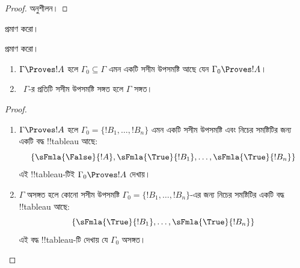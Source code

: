 \documentclass[../../../include/open-logic-section]{subfiles}
\begin{document}
\begin{proof}
অনুশীলন।
\end{proof}

\begin{prob}
 প্রমাণ করো।
\end{prob}
\tagendprob

\begin{prob}
 প্রমাণ করো।
\end{prob}
\tagendprob

\begin{prop}[সংহতি]
  \begin{enumerate}
  \item $\Gamma \Proves !A$ হলে $\Gamma_0\subseteq\Gamma$ এমন একটি
    সসীম উপসমষ্টি আছে যেন $\Gamma_0 \Proves !A$।
  \item ~$\Gamma$-র প্রতিটি সসীম উপসমষ্টি সঙ্গত হলে $\Gamma$ সঙ্গত।
  \end{enumerate}
\end{prop}

\begin{proof}
  \begin{enumerate}
    \item $\Gamma \Proves !A$ হলে
      $\Gamma_0=\{!B_1,\dots,!B_n\}$ এমন একটি সসীম উপসমষ্টি এবং
      নিচের সমষ্টিটির জন্য একটি বদ্ধ !!{tableau} আছে:
      \[
      \{\sFmla{\False}{!A}, \sFmla{\True}{!B_1}, \dots, \sFmla{\True}{!B_n}\}
      \]
      এই !!{tableau}-টিই $\Gamma_0 \Proves !A$ দেখায়।
    \item $\Gamma$ অসঙ্গত হলে কোনো সসীম উপসমষ্টি
      $\Gamma_0=\{!B_1,\dots,!B_n\}$-এর জন্য নিচের সমষ্টিটির একটি
      বদ্ধ !!{tableau} আছে:
      \[
      \{\sFmla{\True}{!B_1}, \dots, \sFmla{\True}{!B_n}\}
      \]
      এই বদ্ধ !!{tableau}-টি দেখায় যে $\Gamma_0$ অসঙ্গত।
  \end{enumerate}
\end{proof}
\end{document}
